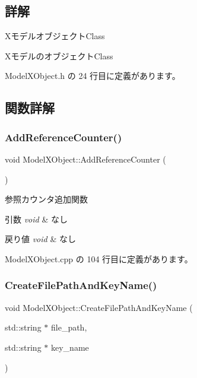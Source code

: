 \subsection{詳解}
Xモデルオブジェクト\+Class 

Xモデルのオブジェクト\+Class 

 Model\+X\+Object.\+h の 24 行目に定義があります。



\subsection{関数詳解}
\mbox{\label{class_model_x_object_a6329bb0953ff48bb440b0142dc64dd64}} 
\subsubsection{\texorpdfstring{Add\+Reference\+Counter()}{AddReferenceCounter()}}
{\footnotesize\ttfamily void Model\+X\+Object\+::\+Add\+Reference\+Counter (\begin{DoxyParamCaption}{ }\end{DoxyParamCaption})}



参照カウンタ追加関数 


\begin{DoxyParams}{引数}
{\em void} & なし \\
\hline
\end{DoxyParams}

\begin{DoxyRetVals}{戻り値}
{\em void} & なし \\
\hline
\end{DoxyRetVals}


 Model\+X\+Object.\+cpp の 104 行目に定義があります。

\mbox{\label{class_model_x_object_ac72ea2bf21c475ba8e9d0b3bf8b9aef4}} 
\subsubsection{\texorpdfstring{Create\+File\+Path\+And\+Key\+Name()}{CreateFilePathAndKeyName()}}
{\footnotesize\ttfamily void Model\+X\+Object\+::\+Create\+File\+Path\+And\+Key\+Name (\begin{DoxyParamCaption}\item[{std\+::string $\ast$}]{file\+\_\+path,  }\item[{std\+::string $\ast$}]{key\+\_\+name }\end{DoxyParamCaption})\hspace{0.3cm}{\ttfamily [private]}}



